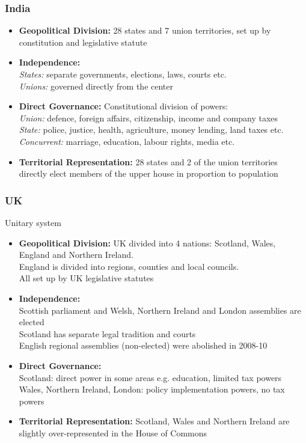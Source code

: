 \documentclass[12pt, letterpaper]{article}
\begin{document}
\subsubsection{India}
\begin{itemize}
	\item \textbf{Geopolitical Division:} 28 states and 7 union territories, set up by constitution and legislative statute
	\item \textbf{Independence:}\\
		\textit{States:} separate governments, elections, laws, courts etc.\\
		\textit{Unions:} governed directly from the center
	\item \textbf{Direct Governance:} Constitutional division of powers:\\
		\textit{Union:} defence, foreign affairs, citizenship, income and company taxes\\
		\textit{State:} police, justice, health, agriculture, money lending, land taxes etc.\\
		\textit{Concurrent:} marriage, education, labour rights, media etc.
	\item \textbf{Territorial Representation:} 28 states and 2 of the union territories directly elect members of the upper house in proportion to population
\end{itemize}

\subsubsection{UK}
Unitary system
\begin{itemize}	
	\item \textbf{Geopolitical Division:} UK divided into 4 nations: Scotland, Wales, England and Northern Ireland.\\
		England is divided into regions, counties and local councils.\\ 
		All set up by UK legislative statutes
	\item \textbf{Independence:}\\
		Scottish parliament and Welsh, Northern Ireland and London assemblies are elected\\
		Scotland has separate legal tradition and courts\\
		English regional assemblies (non-elected) were abolished in 2008-10
	\item \textbf{Direct Governance:}\\
		Scotland: direct power in some areas e.g. education, limited tax powers
		Wales, Northern Ireland, London: policy implementation powers, no tax powers
	\item \textbf{Territorial Representation:} Scotland, Wales and Northern Ireland are slightly over-represented in the House of Commons
\end{itemize}
\end{document}
